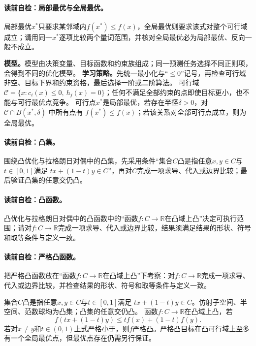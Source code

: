 \paragraph{读前自检：局部最优与全局最优。}局部最优$x^*$只要求某邻域内$f(x^*)\le f(x)$，全局最优则要求该式对整个可行域成立；请用同一$x^*$逐项比较两个量词范围，并核对全局最优必为局部最优、反向一般不成立。\par

\label{struct:V1-C07-CH08}
\textbf{模型。}模型由决策变量、目标函数和约束族组成；同一预测任务选择不同正则项，会得到不同的优化模型。
\label{struct:V1-C07-CH09}
\textbf{学习策略。}先统一最小化与“$\le0$”记号，再检查可行域非空、目标下界和约束资格，最后选择一阶或二阶算法。
可行域 $\mathcal C=\{x:c_i(x)\le0,\ h_j(x)=0\}$；任何不满足全部约束的点即使目标更小，也不能与可行最优点竞争。
可行点$x^*$是局部最优，若存在半径$\delta>0$，对 $\mathcal C\cap B(x^*,\delta)$ 中所有点有 $f(x^*)\le f(x)$；若该关系对全部可行点成立，则为全局最优。


\paragraph{读前自检：凸集。}围绕凸优化与拉格朗日对偶中的凸集，先采用条件“集合$C$凸是指任意$x,y\in C$与$t\in[0,1]$满足 $tx+(1-t)y\in C$”，再对$C$完成一项求导、代入或边界比较；最后验证凸集的任意交仍凸。\par
\paragraph{读前自检：凸函数。}凸优化与拉格朗日对偶中的凸函数中的“函数$f:C\to\mathbb R$在凸域上凸”决定可执行范围；请对$f:C\to\mathbb R$完成一项求导、代入或边界比较，结果须满足结果的形状、符号和取等条件与定义一致。\par
\paragraph{读前自检：严格凸函数。}把严格凸函数放在“函数$f:C\to\mathbb R$在凸域上凸”下考察：对$f:C\to\mathbb R$完成一项求导、代入或边界比较，并检查结果的形状、符号和取等条件与定义一致。\par

集合$C$凸是指任意$x,y\in C$与$t\in[0,1]$满足 $tx+(1-t)y\in C$。仿射子空间、半空间、范数球均为凸集；凸集的任意交仍凸。
函数$f:C\to\mathbb R$在凸域上凸，若
\[
f(tx+(1-t)y)\le tf(x)+(1-t)f(y).
\]
若对$x\ne y$和$t\in(0,1)$上式严格小于，则$f$严格凸。严格凸目标在凸可行域上至多有一个全局最优点，但最优点存在仍需另行保证。

